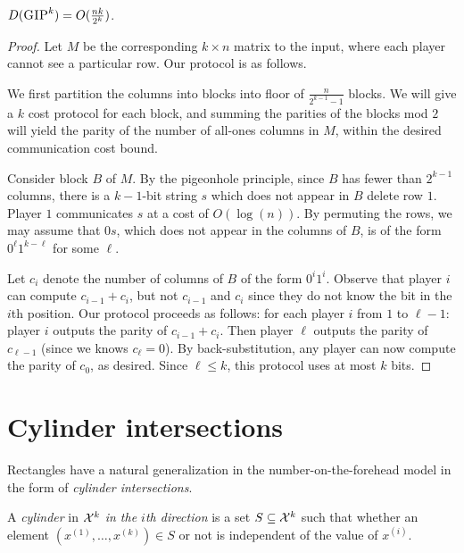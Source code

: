 \begin{theorem}
$D(\textsc{GIP}^k) = O(\frac{nk}{2^k})$.
\end{theorem}

\begin{proof}
Let $M$ be the corresponding $k\times n$ matrix to the input, where each player cannot see a particular row. Our protocol is as follows.

We first partition the columns into blocks into floor of $\frac{n}{2^{k-1}-1}$ blocks. We will give a $k$ cost protocol for each block, and summing the parities of the blocks mod $2$ will yield the parity of the number of all-ones columns in $M$, within the desired communication cost bound.

Consider block $B$ of $M$. By the pigeonhole principle, since $B$ has fewer than $2^{k-1}$ columns, there is a $k-1$-bit string $s$ which does not appear in $B$ delete row $1$. Player $1$ communicates $s$ at a cost of $O(\log(n))$. By permuting the rows, we may assume that $0s$, which does not appear in the columns of $B$, is of the form $0^\ell 1^{k-\ell}$ for some $\ell$.

Let $c_i$ denote the number of columns of $B$ of the form $0^i1^i$. Observe that player $i$ can compute $c_{i-1} + c_i$, but not $c_{i-1}$ and $c_i$ since they do not know the bit in the $i$th position. Our protocol proceeds as follows: for each player $i$ from $1$ to $\ell-1$: player $i$ outputs the parity of $c_{i-1} + c_i$. Then player $\ell$ outputs the parity of  $c_{\ell - 1}$ (since we knows $c_\ell = 0$). By back-substitution, any player can now compute the parity of $c_0$, as desired. Since $\ell \leq k$, this protocol uses at most $k$ bits.
\end{proof}



\newpage 
\section{Cylinder intersections}

Rectangles have a natural generalization in the number-on-the-forehead model in the form of \emph{cylinder intersections}.

\begin{definition}
A \emph{cylinder} in $\mathcal{X}^k$ \emph{in the $i$th direction} is a set $S \subseteq \mathcal{X}^k$ such that whether an element $(x^{(1)},\ldots,x^{(k)}) \in S$ or not is independent of the value of $x^{(i)}$.
\end{definition}

